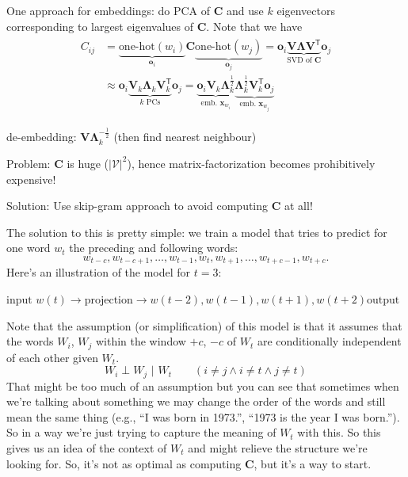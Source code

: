 \documentclass[a2paper,8pt]{extarticle}
\newcommand{\cV}{\mathcal{V}}
\newcommand{\card}[1]{\left\lvert #1 \right\rvert}
\newcommand{\indep}{\perp}
\newcommand{\given}{\,\,|\,\,}
\newcommand*{\T}{\mathsf{T}}
\newcommand{\mat}[1]{\mathbf{#1}}
\renewcommand{\vec}[1]{\mathbf{#1}}
\newcommand{\vo}{\vec{o}}
\newcommand{\vx}{\vec{x}}
\newcommand{\MC}{\mat{C}}
\newcommand{\MV}{\mat{V}}
\newcommand{\MLambda}{\mat{\Lambda}}
\newcommand{\ssep}{\hdashrule[1.1ex]{\linewidth}{0.1pt}{0.3mm}\vspace{-6pt}}
\newcommand{\ssep}{\hdashrule[1.1ex]{\linewidth}{0.1pt}{0.3mm}\vspace{-3pt}}
\begin{document}
\begin{landscape}
\begin{multicols*}{7}
One approach for embeddings: do PCA of $\MC$ and use $k$ eigenvectors
corresponding to largest eigenvalues of $\MC$. Note that we have
\begin{gather*}
\begin{align*}
C_{ij}
&=
\underbrace{\text{one-hot}(w_i)}_{\vo_i}\MC
\underbrace{\text{one-hot}(w_j)}_{\vo_j}
=
\vo_i\underbrace{\MV\MLambda\MV^\T}_{\text{SVD of }\MC}\vo_j
\\
&\approx
\vo_i\underbrace{\MV_k\MLambda_k\MV_k^\T}_{k\text{ PCs}}\vo_j
=
\underbrace{\vo_i\MV_k\MLambda_k^{\frac{1}{2}}}_{\text{emb. }\vx_{w_i}}
\underbrace{\MLambda_k^{\frac{1}{2}}\MV_k^\T\vo_j}_{\text{emb. }\vx_{w_j}}
\end{align*}
\end{gather*}

de-embedding: $\MV\MLambda_k^{-\frac{1}{2}}$ (then find nearest neighbour)

Problem: $\MC$ is huge ($\card{\cV}^2$), hence matrix-factorization becomes
prohibitively expensive!

Solution: Use skip-gram approach to avoid computing $\MC$ at all!

\ssep

The solution to this is pretty simple: we train a model that tries to predict
for one word $w_t$ the preceding and following words:
\[
w_{t-c},w_{t-c+1},\ldots,w_{t-1},w_t,w_{t+1},\ldots,w_{t+c-1},w_{t+c}.
\]
Here's an illustration of the model for $t=3$:

$\text{input }w(t)\to\text{projection}\to w(t-2), w(t-1), w(t+1), w(t+2) \text{
output}$

Note that the assumption (or simplification) of this model is that it assumes
that the words $W_i$, $W_j$ within the window $+c$, $-c$ of $W_t$ are
conditionally independent of each other given $W_t$.
\[
W_i\indep W_j\given W_t
\qquad
(i\neq j\land i\neq t\land j\neq t)
\]
That might be too much of an assumption but you can see that sometimes when
we're talking about something we may change the order of the words and still
mean the same thing (e.g., ``I was born in 1973.'', ``1973 is the year I was
born.''). So in a way we're just trying to capture the meaning of $W_t$ with
this. So this gives us an idea of the context of $W_t$ and might relieve the
structure we're looking for. So, it's not as optimal as computing $\MC$, but
it's a way to start.

\ssep


\end{multicols*}
\end{landscape}
\end{document}

